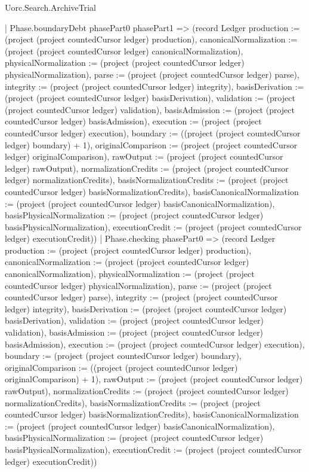 \begin{lexlean}{Uorc.Search.ArchiveTrial}
\begin{semanticmodule}
{{      | Phase.boundaryDebt phasePart0 phasePart1 => (record Ledger {production := (project (project countedCursor ledger) production), canonicalNormalization := (project (project countedCursor ledger) canonicalNormalization), physicalNormalization := (project (project countedCursor ledger) physicalNormalization), parse := (project (project countedCursor ledger) parse), integrity := (project (project countedCursor ledger) integrity), basisDerivation := (project (project countedCursor ledger) basisDerivation), validation := (project (project countedCursor ledger) validation), basisAdmission := (project (project countedCursor ledger) basisAdmission), execution := (project (project countedCursor ledger) execution), boundary := ((project (project countedCursor ledger) boundary) + 1), originalComparison := (project (project countedCursor ledger) originalComparison), rawOutput := (project (project countedCursor ledger) rawOutput), normalizationCredits := (project (project countedCursor ledger) normalizationCredits), basisNormalizationCredits := (project (project countedCursor ledger) basisNormalizationCredits), basisCanonicalNormalization := (project (project countedCursor ledger) basisCanonicalNormalization), basisPhysicalNormalization := (project (project countedCursor ledger) basisPhysicalNormalization), executionCredit := (project (project countedCursor ledger) executionCredit)})
      | Phase.checking phasePart0 => (record Ledger {production := (project (project countedCursor ledger) production), canonicalNormalization := (project (project countedCursor ledger) canonicalNormalization), physicalNormalization := (project (project countedCursor ledger) physicalNormalization), parse := (project (project countedCursor ledger) parse), integrity := (project (project countedCursor ledger) integrity), basisDerivation := (project (project countedCursor ledger) basisDerivation), validation := (project (project countedCursor ledger) validation), basisAdmission := (project (project countedCursor ledger) basisAdmission), execution := (project (project countedCursor ledger) execution), boundary := (project (project countedCursor ledger) boundary), originalComparison := ((project (project countedCursor ledger) originalComparison) + 1), rawOutput := (project (project countedCursor ledger) rawOutput), normalizationCredits := (project (project countedCursor ledger) normalizationCredits), basisNormalizationCredits := (project (project countedCursor ledger) basisNormalizationCredits), basisCanonicalNormalization := (project (project countedCursor ledger) basisCanonicalNormalization), basisPhysicalNormalization := (project (project countedCursor ledger) basisPhysicalNormalization), executionCredit := (project (project countedCursor ledger) executionCredit)})
}}
\end{semanticmodule}
\end{lexlean}

